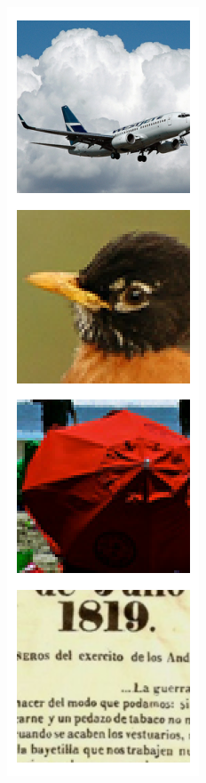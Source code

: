 \documentclass{article} %
\begin{document}
\begin{figure}[h]
\centering
\begin{subfigure}[t]{0.16\columnwidth}
\includegraphics[width=1\columnwidth]{figures/latents/ground_truth.png}\caption{}

\end{subfigure}
\end{figure}
\end{document}
